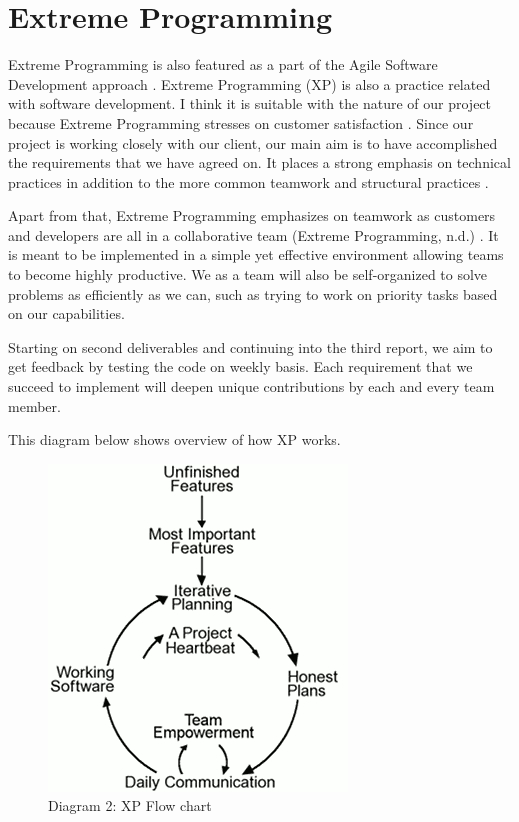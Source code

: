 \documentclass[12pt]{article}
\begin{document}
	\newpage
	
	\section{Extreme Programming}
		Extreme Programming is also featured as a part of the Agile Software Development approach \cite{agileModeling}. Extreme Programming (XP) is also a practice related with software development. I think it is suitable with the nature of our project because Extreme Programming stresses on customer satisfaction \cite{agileXPFlowchart}. Since our project is working closely with our client, our main aim is to have accomplished the requirements that we have agreed on.  It places a strong emphasis on technical practices in addition to the more common teamwork and structural practices \cite{agileArtOfDevelopment}.
		
		
		Apart from that, Extreme Programming emphasizes on teamwork as customers and developers are all in a collaborative team (Extreme Programming, n.d.) \cite{agileXPFlowchart}. It is meant to be implemented in a simple yet effective environment allowing teams to become highly productive. We as a team will also be self-organized to solve problems as efficiently as we can, such as trying to  work on priority tasks based on our capabilities.
		
		Starting on second deliverables and continuing into the third report, we aim to get feedback by testing the code on weekly basis. Each requirement that we succeed to implement will deepen unique contributions by each and every team member. 
		
		This diagram below shows overview of how XP works.  
		
		\begin{figure}[htbp]
			\centerline{\includegraphics{agileflowchart.jpg}}
			\caption{Diagram 2: XP Flow chart \cite{agileXPFlowchart}}
		\end{figure}
		
\end{document}
